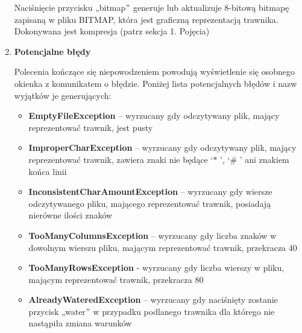 \documentclass[12pt]{article}
\renewcommand{\_}{\kern-1.5pt\textunderscore\kern-1.5pt}
\begin{document}
\begin{enumerate}
Naciśnięcie przycisku „bitmap$"$  generuje lub aktualizuje 8-bitową bitmapę zapisaną w pliku BITMAP, która jest graficzną reprezentacją trawnika. Dokonywana jest kompresja (patrz sekcja 1. Pojęcia)\par


\vspace{\baselineskip}

\vspace{\baselineskip}

\vspace{\baselineskip}
	\item \textbf{Potencjalne błędy}\par

Polecenia kończące się niepowodzeniem powodują wyświetlenie się osobnego okienka z komunikatem o błędzie. Poniżej lista potencjalnych błędów i nazw wyjątków je generujących:\par

\begin{itemize}
	\item \textbf{EmptyFileException} – wyrzucany gdy odczytywany plik, mający reprezentować trawnik, jest pusty\par

	\item \textbf{ImproperCharException} – wyrzucany gdy odczytywany plik, mający reprezentować trawnik, zawiera znaki nie będące ‘$\ast$ ’, ‘$\#$ ’ ani znakiem końca linii\par

	\item \textbf{InconsistentCharAmountException} – wyrzucany gdy wiersze odczytywanego pliku, mającego reprezentować trawnik, posiadają nierówne ilości znaków\par

	\item \textbf{TooManyColumnsException} – wyrzucany gdy liczba znaków w dowolnym wierszu pliku, mającym reprezentować trawnik, przekracza 40\par

	\item \textbf{TooManyRowsException} - wyrzucany gdy liczba wierszy w pliku, mającym reprezentować trawnik, przekracza 80\par

	\item \textbf{AlreadyWateredException} – wyrzucany gdy naciśnięty zostanie przycisk „water$"$  w przypadku podlanego trawnika dla którego nie nastąpiła zmiana warunków\par


\end{itemize}
\end{enumerate}
\end{document}
